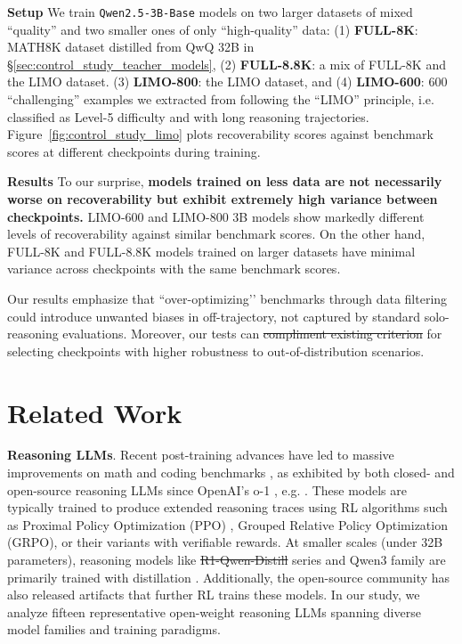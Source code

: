\documentclass{article} %
\providecommand{\DIFaddtex}[1]{{\protect\color{blue}\uwave{#1}}} %
\providecommand{\DIFdeltex}[1]{{\protect\color{red}\sout{#1}}}                      %
\providecommand{\DIFaddbegin}{} %
\providecommand{\DIFaddend}{} %
\providecommand{\DIFdelbegin}{} %
\providecommand{\DIFdelend}{} %
\providecommand{\DIFadd}[1]{\texorpdfstring{\DIFaddtex{#1}}{#1}} %
\providecommand{\DIFdel}[1]{\texorpdfstring{\DIFdeltex{#1}}{}} %
\newcommand{\DIFscaledelfig}{0.5}
\newlength{\DIFdelgraphicswidth} %
\newlength{\DIFdelgraphicsheight} %
\newcommand{\DIFaddincludegraphics}[2][]{{\color{blue}\fbox{\DIFOincludegraphics[#1]{#2}}}} %
\newcommand{\DIFdelincludegraphics}[2][]{%
\sbox{\DIFdelgraphicsbox}{\DIFOincludegraphics[#1]{#2}}%
\settoboxwidth{\DIFdelgraphicswidth}{\DIFdelgraphicsbox} %
\settoboxtotalheight{\DIFdelgraphicsheight}{\DIFdelgraphicsbox} %
\scalebox{\DIFscaledelfig}{%
\parbox[b]{\DIFdelgraphicswidth}{\usebox{\DIFdelgraphicsbox}\\[-\baselineskip] \rule{\DIFdelgraphicswidth}{0em}}\llap{\resizebox{\DIFdelgraphicswidth}{\DIFdelgraphicsheight}{%
\setlength{\unitlength}{\DIFdelgraphicswidth}%
\begin{picture}(1,1)%
\thicklines\linethickness{2pt} %
{\color[rgb]{1,0,0}\put(0,0){\framebox(1,1){}}}%
{\color[rgb]{1,0,0}\put(0,0){\line( 1,1){1}}}%
{\color[rgb]{1,0,0}\put(0,1){\line(1,-1){1}}}%
\end{picture}%
}\hspace*{3pt}}} %
} %
\DeclareRobustCommand{\DIFaddbegin}{\DIFOaddbegin \let\includegraphics\DIFaddincludegraphics} %
\DeclareRobustCommand{\DIFaddend}{\DIFOaddend \let\includegraphics\DIFOincludegraphics} %
\DeclareRobustCommand{\DIFdelbegin}{\DIFOdelbegin \let\includegraphics\DIFdelincludegraphics} %
\DeclareRobustCommand{\DIFdelend}{\DIFOaddend \let\includegraphics\DIFOincludegraphics} %
\begin{document}
\textbf{Setup} We train \texttt{Qwen2.5-3B-Base} models on two larger datasets of mixed ``quality'' and two smaller ones of only ``high-quality'' data: (1) \textbf{FULL-8K}: MATH8K dataset distilled from QwQ 32B in \S \ref{sec:control_study_teacher_models}, (2) \textbf{FULL-8.8K}: a mix of FULL-8K and the LIMO dataset. (3) \textbf{LIMO-800}: the LIMO dataset, and (4) \textbf{LIMO-600}: 600 ``challenging''
examples we extracted from following the ``LIMO'' principle, i.e. classified as Level-5 difficulty and with long reasoning trajectories. Figure~\ref{fig:control_study_limo} plots recoverability scores against benchmark scores at different checkpoints during training.


\textbf{Results} 
To our surprise, \textbf{models trained on less data are not necessarily worse on recoverability but exhibit extremely high variance between checkpoints.} LIMO-600 and LIMO-800 3B models show markedly different levels of recoverability against similar benchmark scores. On the other hand, FULL-8K and FULL-8.8K models trained on larger datasets have minimal variance across checkpoints with the same benchmark scores. 

Our results emphasize that ``over-optimizing’’ benchmarks through data filtering could introduce unwanted biases in off-trajectory, not captured by standard solo-reasoning evaluations. Moreover, our tests can \DIFdelbegin \DIFdel{compliment existing criterion }\DIFdelend \DIFaddbegin \DIFadd{complement existing criteria }\DIFaddend for selecting checkpoints with higher robustness to out-of-distribution scenarios.

\section{Related Work}
\label{sec:background}
\textbf{Reasoning LLMs}. Recent post-training advances have led to massive improvements on math and coding benchmarks \citep{huang2025gemini, guo2025deepseek}, as exhibited by both closed- and open-source reasoning LLMs since OpenAI's o-1 \citep{jaech2024openai}, e.g. \cite{guo2025deepseek,yang2025qwen3,guha2025openthoughts, ye2025limoreasoning,ji2025thinking}. These models are typically trained to produce extended reasoning traces using RL algorithms such as Proximal Policy Optimization (PPO) \citep{schulman2017proximal}, Grouped Relative Policy Optimization (GRPO), or their variants \citep{shao2024deepseekmath} with verifiable rewards.
At smaller scales (under 32B parameters), reasoning models like \DIFdelbegin \DIFdel{R1-Qwen-Distill }\DIFdelend \DIFaddbegin \DIFadd{R1-Qwen }\DIFaddend series \citep{guo2025deepseek} and Qwen3 family \citep{yang2025qwen3} are primarily trained with distillation \citep{hinton2015distilling}. Additionally, the open-source community has also released artifacts that further RL trains these models. In our study, we analyze fifteen representative open-weight reasoning LLMs spanning diverse model families and training paradigms.
\end{document}
